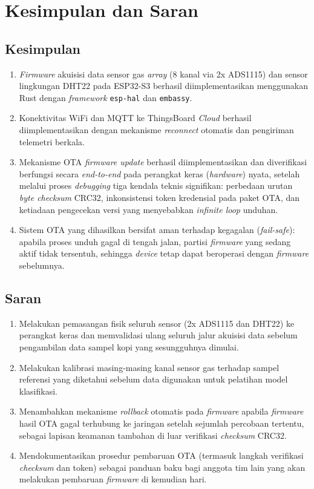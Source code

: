 \documentclass[12pt,a4paper]{report}
\begin{document}
\chapter{Kesimpulan dan Saran}

\section{Kesimpulan}
\begin{enumerate}[label=\arabic*.]
    \item \textit{Firmware} akuisisi data sensor gas \textit{array} (8 kanal via 2x ADS1115) dan
    sensor lingkungan DHT22 pada ESP32-S3 berhasil diimplementasikan menggunakan
    Rust dengan \textit{framework} \texttt{esp-hal} dan \texttt{embassy}.
    \item Konektivitas WiFi dan MQTT ke ThingsBoard \textit{Cloud} berhasil diimplementasikan
    dengan mekanisme \textit{reconnect} otomatis dan pengiriman telemetri berkala.
    \item Mekanisme OTA \textit{firmware update} berhasil diimplementasikan dan diverifikasi
    berfungsi secara \textit{end-to-end} pada perangkat keras (\textit{hardware}) nyata, setelah melalui
    proses \textit{debugging} tiga kendala teknis signifikan: perbedaan urutan \textit{byte
    checksum} CRC32, inkonsistensi token kredensial pada paket OTA, dan
    ketiadaan pengecekan versi yang menyebabkan \textit{infinite loop} unduhan.
    \item Sistem OTA yang dihasilkan bersifat aman terhadap kegagalan
    (\textit{fail-safe}): apabila proses unduh gagal di tengah jalan, partisi
    \textit{firmware} yang sedang aktif tidak tersentuh, sehingga \textit{device} tetap dapat
    beroperasi dengan \textit{firmware} sebelumnya.
\end{enumerate}

\section{Saran}
\begin{enumerate}[label=\arabic*.]
    \item Melakukan pemasangan fisik seluruh sensor (2x ADS1115 dan DHT22) ke
    perangkat keras dan memvalidasi ulang seluruh jalur akuisisi data sebelum
    pengambilan data sampel kopi yang sesungguhnya dimulai.
    \item Melakukan kalibrasi masing-masing kanal sensor gas terhadap sampel
    referensi yang diketahui sebelum data digunakan untuk pelatihan model
    klasifikasi.
    \item Menambahkan mekanisme \textit{rollback} otomatis pada \textit{firmware} apabila
    \textit{firmware} hasil OTA gagal terhubung ke jaringan setelah sejumlah percobaan
    tertentu, sebagai lapisan keamanan tambahan di luar verifikasi \textit{checksum} CRC32.
    \item Mendokumentasikan prosedur pembaruan OTA (termasuk langkah verifikasi
    \textit{checksum} dan token) sebagai panduan baku bagi anggota tim lain yang
    akan melakukan pembaruan \textit{firmware} di kemudian hari.
\end{enumerate}
\end{document}
